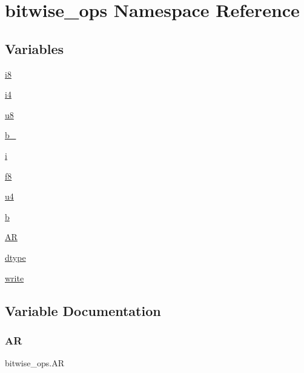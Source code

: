 \hypertarget{namespacebitwise__ops}{}\section{bitwise\+\_\+ops Namespace Reference}
\label{namespacebitwise__ops}
\subsection*{Variables}
\begin{DoxyCompactItemize}
\item 
\hyperlink{namespacebitwise__ops_ab3521a7d53cdb546f4e6849c23aefdb8}{i8}
\item 
\hyperlink{namespacebitwise__ops_ae021228dd027f7b051bd7a1530ab4aa6}{i4}
\item 
\hyperlink{namespacebitwise__ops_ac2f539cfcf314fc1634485bb5e319ea9}{u8}
\item 
\hyperlink{namespacebitwise__ops_ae894d2e0977d4bb4466b075e1a58b300}{b\+\_\+}
\item 
\hyperlink{namespacebitwise__ops_a441fe5edcab52dbb93d045e1f14f6364}{i}
\item 
\hyperlink{namespacebitwise__ops_a7963867ba3c9823686ccd6bb7b41a7d4}{f8}
\item 
\hyperlink{namespacebitwise__ops_a23f2defb8451d60c185992e573aefbce}{u4}
\item 
\hyperlink{namespacebitwise__ops_ae1a983c605459214cde8a7dacf7723af}{b}
\item 
\hyperlink{namespacebitwise__ops_a8d173f5aa89e87122893d37936dd5d15}{AR}
\item 
\hyperlink{namespacebitwise__ops_a3f43ba5eb31d58c54d3301f0a15b16c6}{dtype}
\item 
\hyperlink{namespacebitwise__ops_a47b4f6faa77b94c999995f173263fce0}{write}
\end{DoxyCompactItemize}


\subsection{Variable Documentation}
\mbox{\label{namespacebitwise__ops_a8d173f5aa89e87122893d37936dd5d15}} 
\subsubsection{\texorpdfstring{AR}{AR}}
{\footnotesize\ttfamily bitwise\+\_\+ops.\+AR}

